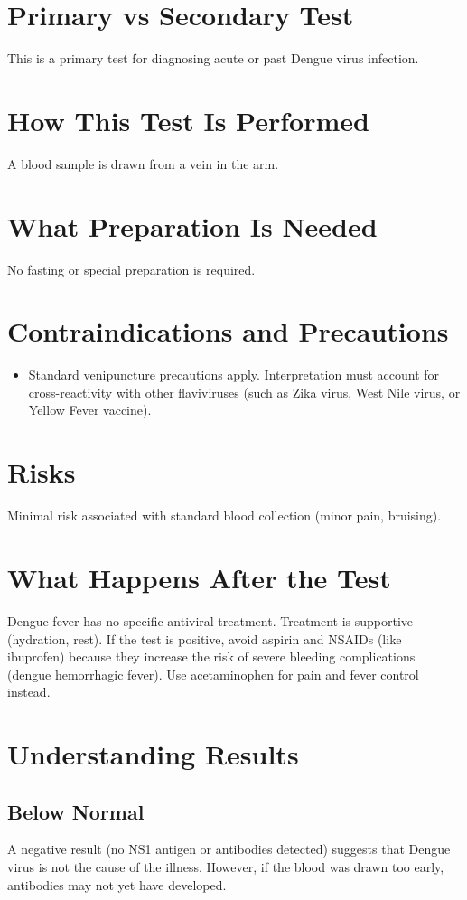 \section*{Primary vs Secondary Test}
This is a primary test for diagnosing acute or past Dengue virus infection.

\section*{How This Test Is Performed}
A blood sample is drawn from a vein in the arm.

\section*{What Preparation Is Needed}
No fasting or special preparation is required.

\section*{Contraindications and Precautions}
\begin{itemize}
  \item Standard venipuncture precautions apply. Interpretation must account for cross-reactivity with other flaviviruses (such as Zika virus, West Nile virus, or Yellow Fever vaccine).
\end{itemize}
\section*{Risks}
Minimal risk associated with standard blood collection (minor pain, bruising).

\section*{What Happens After the Test}
Dengue fever has no specific antiviral treatment. Treatment is supportive (hydration, rest). If the test is positive, avoid aspirin and NSAIDs (like ibuprofen) because they increase the risk of severe bleeding complications (dengue hemorrhagic fever). Use acetaminophen for pain and fever control instead.

\section*{Understanding Results}

\subsection*{Below Normal}
A negative result (no NS1 antigen or antibodies detected) suggests that Dengue virus is not the cause of the illness. However, if the blood was drawn too early, antibodies may not yet have developed.

